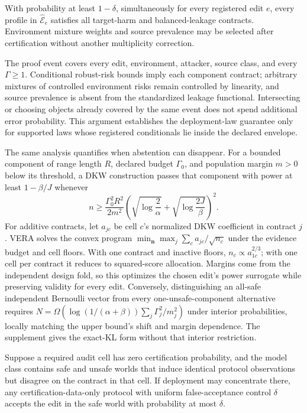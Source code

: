 \begin{theorem}
With probability at least $1-\delta$, simultaneously for every registered edit
$e$, every profile in $\widehat{\mathcal E}_e$ satisfies all target-harm and
balanced-leakage contracts. Environment mixture weights and source prevalence
may be selected after certification without another multiplicity correction.
\end{theorem}

The proof event covers every edit, environment, attacker, source class, and
every $\Gamma\ge1$. Conditional robust-risk bounds imply each component
contract; arbitrary mixtures of controlled environment risks remain controlled
by linearity, and source prevalence is absent from the standardized leakage
functional. Intersecting or choosing objects already covered by the same event
does not spend additional error probability. This argument establishes the
deployment-law guarantee only for supported laws whose registered
conditionals lie inside the declared envelope.

The same analysis quantifies when abstention can disappear. For a bounded
component of range length $R$, declared budget $\Gamma_0$, and population
margin $m>0$ below its threshold, a DKW construction passes that component with
power at least $1-\beta/J$ whenever
\begin{equation}
n\ge \frac{\Gamma_0^2R^2}{2m^2}
\left(\sqrt{\log\frac{2}{\alpha}}+
\sqrt{\log\frac{2J}{\beta}}\right)^2.
\end{equation}
For additive contracts, let $a_{jc}$ be cell $c$'s normalized DKW coefficient
in contract $j$. VERA solves the convex program
$\min_{\boldsymbol n}\max_j\sum_c a_{jc}/\sqrt{n_c}$ under the evidence budget
and cell floors. With one contract and inactive floors,
$n_c\propto a_{1c}^{2/3}$; with one cell per contract it reduces to squared-score
allocation. Margins come from the independent design fold, so this optimizes
the chosen edit's power surrogate while preserving validity for every edit.
Conversely, distinguishing an all-safe independent Bernoulli vector from every
one-unsafe-component alternative requires
$N=\Omega(\log(1/(\alpha+\beta))\sum_j\Gamma_j^2/m_j^2)$ under interior
probabilities, locally matching the upper bound's shift and margin dependence.
The supplement gives the exact-KL form without that interior restriction.

\begin{theorem}
Suppose a required audit cell has zero certification probability, and the model
class contains safe and unsafe worlds that induce identical protocol
observations but disagree on the contract in that cell. If deployment may
concentrate there, any certification-data-only protocol with uniform false-acceptance
control $\delta$ accepts the edit in the safe world with probability at most
$\delta$.
\end{theorem}

